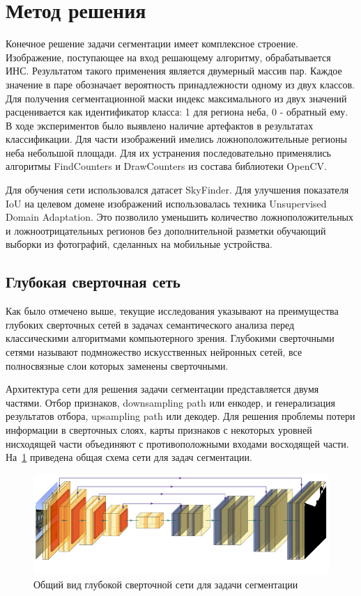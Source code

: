 \section{Метод решения}

Конечное решение задачи сегментации имеет комплексное строение.
Изображение, поступающее на вход решающему алгоритму, обрабатывается ИНС.
Результатом такого применения является двумерный массив пар.
Каждое значение в паре обозначает вероятность принадлежности одному из двух классов.
Для получения сегментационной маски индекс максимального из двух значений расценивается как идентификатор класса: 1 для региона неба, 0 - обратный ему.
В ходе экспериментов было выявлено наличие артефактов в результатах классификации.
Для части изображений имелись ложноположительные регионы неба небольшой площади.
Для их устранения последовательно применялись алгоритмы FindCounters и DrawCounters из состава библиотеки OpenCV.

Для обучения сети использовался датасет SkyFinder.
Для улучшения показателя IoU на целевом домене изображений использовалась техника Unsupervised Domain Adaptation.
Это позволило уменьшить количество ложноположительных и ложноотрицательных регионов без дополнительной разметки обучающий выборки из фотографий,
сделанных на мобильные устройства.

\subsection{Глубокая сверточная сеть}

Как было отмечено выше, текущие исследования указывают на преимущества глубоких сверточных сетей в задачах семантического анализа
перед классическими алгоритмами компьютерного зрения.
Глубокими сверточными сетями называют подмножество искусственных нейронных сетей, все полносвязные слои которых заменены сверточными.

Архитектура сети для решения задачи сегментации представляется двумя частями.
Отбор признаков, downsampling path или енкодер, и генерализация результатов отбора, upsampling path или декодер.
Для решения проблемы потери информации в сверточных слоях, карты признаков с некоторых уровней нисходящей части объединяют с противоположными входами восходящей части.
На~\ref{fig:net_arch_common} приведена общая схема сети для задач сегментации.

\begin{figure}[H]
    \centering
    \includegraphics[width=\textwidth]{img/net_arch.png}
    \caption{Общий вид глубокой сверточной сети для задачи сегментации}
    \label{fig:net_arch_common}
\end{figure}

